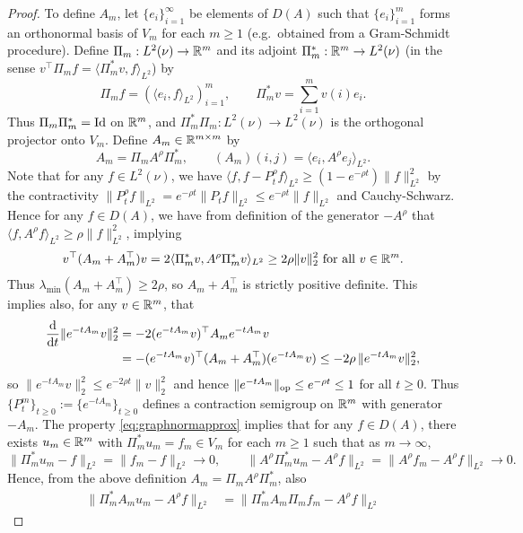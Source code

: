\begin{proof}
To define $A_m$, let $\{e_i\}_{i=1}^\infty$ be elements
of $D(A)$ such that $\{e_i\}_{i=1}^m$ forms an orthonormal basis of $V_m$ for
each $m \geq 1$ (e.g.\ obtained from a Gram-Schmidt procedure).
Define $\Pi_m:L^2(\nu) \to \mathbb{R}^m$ 
and its adjoint $\Pi_m^*:\mathbb{R}^m \to L^2(\nu)$ (in the sense
$v^\top \Pi_m f=\langle \Pi_m^* v,f \rangle_{L^2}$) by
\[\Pi_m f=(\langle e_i,f \rangle_{L^2})_{i=1}^m,
\qquad \Pi_m^* v=\sum_{i=1}^m v(i)e_i.\]
Thus $\Pi_m\Pi_m^*=\mathrm{Id}$ on $\mathbb{R}^m$, and
$\Pi_m^*\Pi_m:L^2(\nu) \to L^2(\nu)$ is the orthogonal projector onto
$V_m$. Define $A_m \in \mathbb{R}^{m \times m}$ by
\[A_m=\Pi_m A^\rho \Pi_m^*,
\qquad (A_m)(i,j)=\langle e_i,A^\rho e_j \rangle_{L^2}.\]
Note that for any $f \in L^2 (\nu)$, we have $\langle f,f-P_t^\rho f \rangle_{L^2} \geq
(1-e^{-\rho t})\|f\|_{L^2}^2$
by the contractivity $\|P_t^\rho f\|_{L^2}
=e^{-\rho t}\|P_t f\|_{L^2} \leq e^{-\rho t}\|f\|_{L^2}$
and Cauchy-Schwarz. Hence for any $f \in D(A)$, we have from definition of the
generator ${-}A^\rho$ that $\langle f,A^\rho f \rangle_{L^2} \geq
\rho\|f\|_{L^2}^2$, implying
\begin{equation}\label{eq:Apsd}
v^\top (A_m+A_m^\top) v 
=2\langle \Pi_m^* v,A^\rho \Pi_m^* v \rangle_{L^2}
\geq 2\rho\|v\|_2^2 \text{ for all } v \in \mathbb{R}^m.
\end{equation}
Thus $\lambda_{\min}(A_m+A_m^\top) \geq 2\rho$, so $A_m+A_m^\top$ is
strictly positive definite. This implies also, for any $v \in \mathbb{R}^m$, that
\begin{align*}
\frac{\mathrm{d}}{\mathrm{d} t}\|e^{-tA_m}v\|_2^2
&=-2(e^{-tA_m}v)^\top A_me^{-tA_m}v\\
&=-(e^{-tA_m}v)^\top(A_m+A_m^\top)(e^{-tA_m}v)\leq -2\rho\,\|e^{-tA_m}v\|_2^2,
\end{align*}
so $\|e^{-tA_m}v\|_2^2 \leq e^{-2\rho t}\|v\|_2^2$
and hence $\|e^{-tA_m}\|_{\mathrm{op}} \leq e^{-\rho t} \leq 1$ for all $t \geq 0$.
Thus $\{P_t^m\}_{t \geq 0}:=\{e^{-tA_m}\}_{t \geq 0}$ defines
a contraction semigroup on $\mathbb{R}^m$ with generator ${-}A_m$.
The property \eqref{eq:graphnormapprox} implies that for any $f \in D(A)$,
there exists $u_m \in \mathbb{R}^m$ with $\Pi_m^*u_m=f_m \in V_m$
for each $m \geq 1$ such that as $m \to \infty$,
\begin{equation}\label{eq:umapprox}
\|\Pi_m^*u_m-f\|_{L^2}=\|f_m-f\|_{L^2} \to 0,
\qquad \|A^\rho \Pi_m^*u_m-A^\rho f\|_{L^2}=\|A^\rho f_m-A^\rho f\|_{L^2} \to 0.
\end{equation}
Hence, from the above definition $A_m=\Pi_mA^\rho \Pi_m^*$, also
\begin{align}
\|\Pi_m^*A_mu_m-A^\rho f\|_{L^2}
&=\|\Pi_m^*A_m\Pi_mf_m-A^\rho f\|_{L^2}

\end{align}
\end{proof}
